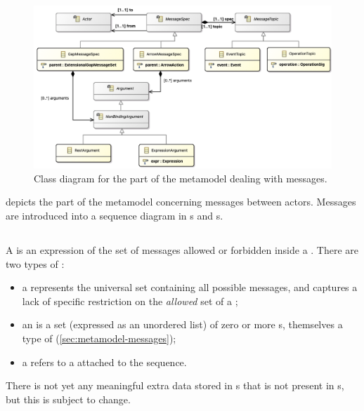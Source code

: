 \begin{figure}
	\centering
	\includegraphics[width=\textwidth]{diagrams/messages.png}
	\caption{Class diagram for the part of the \langname{} metamodel dealing with messages.}
	\label{fig:metamodel-messages}
\end{figure}

 depicts the part of the metamodel concerning
messages between actors.  Messages are introduced into a sequence diagram
in \mmessageset s and \marrowaction s.

\subsection{\mmessageset}\label{ssec:metamodel-messages-sets}

A \mmessageset{} is an expression of the set of messages allowed or forbidden
inside a \msequencegap.  There are two types of \mmessageset:

\begin{itemize}
\item
  a \muniversemessageset{} represents the universal set containing 
  all possible messages, and
  captures a lack of specific restriction on
  the \emph{allowed} set of a \msequencegap;
\item	
  an \mextensionalmessageset{} is a set (expressed as an unordered list) of
  zero or more \mgapmessagespec s, themselves
  a type of \mmessagespec{} (\cref{sec:metamodel-messages});
\item
  a \mrefmessageset{} refers to a \mnamedmessageset{} attached to the
  sequence.
\end{itemize}

There is not yet any meaningful extra data stored in
\mgapmessagespec s that is not present in \mmessagespec s, but this is subject
to change.

